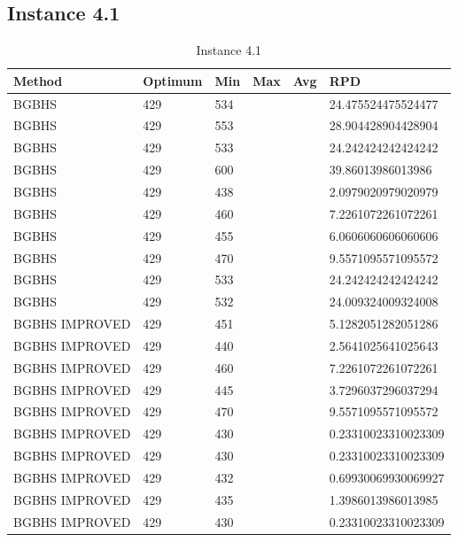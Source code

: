 \subsection{Instance 4.1}


\begin{table}[H]
\centering
\begin{tabular}{ | l | l | l | l | l | l | }
\hline
	Method & Optimum & Min & Max & Avg & RPD \\ \hline
	BGBHS & 429 & 534 &  &  & 24.475524475524477 \\ \hline
	BGBHS & 429 & 553 &  &  & 28.904428904428904 \\ \hline
	BGBHS & 429 & 533 &  &  & 24.242424242424242 \\ \hline
	BGBHS & 429 & 600 &  &  & 39.86013986013986 \\ \hline
	BGBHS & 429 & 438 &  &  & 2.0979020979020979 \\ \hline
	BGBHS & 429 & 460 &  &  & 7.2261072261072261 \\ \hline
	BGBHS & 429 & 455 &  &  & 6.0606060606060606 \\ \hline
	BGBHS & 429 & 470 &  &  & 9.5571095571095572 \\ \hline
	BGBHS & 429 & 533 &  &  & 24.242424242424242 \\ \hline
	BGBHS & 429 & 532 &  &  & 24.009324009324008 \\ \hline
	BGBHS IMPROVED & 429 & 451 &  &  & 5.1282051282051286 \\ \hline
	BGBHS IMPROVED & 429 & 440 &  &  & 2.5641025641025643 \\ \hline
	BGBHS IMPROVED & 429 & 460 &  &  & 7.2261072261072261 \\ \hline
	BGBHS IMPROVED & 429 & 445 &  &  & 3.7296037296037294 \\ \hline
	BGBHS IMPROVED & 429 & 470 &  &  & 9.5571095571095572 \\ \hline
	BGBHS IMPROVED & 429 & 430 &  &  & 0.23310023310023309 \\ \hline
	BGBHS IMPROVED & 429 & 430 &  &  & 0.23310023310023309 \\ \hline
	BGBHS IMPROVED & 429 & 432 &  &  & 0.69930069930069927 \\ \hline
	BGBHS IMPROVED & 429 & 435 &  &  & 1.3986013986013985 \\ \hline
	BGBHS IMPROVED & 429 & 430 &  &  & 0.23310023310023309 \\ \hline
\end{tabular}

\caption{Instance 4.1}
\label{tblscp41}
\end{table}



